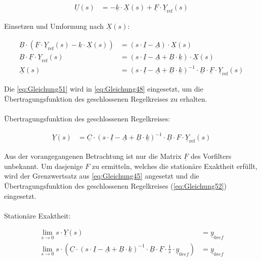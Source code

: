 \begin{align*}
    \underline{U}(s) &= -\underline{k}\cdot\underline{X}(s)+\underline{F}\cdot\underline{Y}_{\mathrm{ref}}(s)
\end{align*}

Einsetzen und Umformung nach $\underline{X}(s)$:

\begin{align}
    \underline{B}\cdot(\underline{F}\cdot\underline{Y}_{\mathrm{ref}}(s)-\underline{k}\cdot\underline{X}(s)) &= (s\cdot\underline{I}-\underline{A})\cdot\underline{X}(s) \nonumber \\
    \underline{B}\cdot \underline{F}\cdot\underline{Y}_{\mathrm{ref}}(s) &= (s\cdot\underline{I}-\underline{A}+\underline{B}\cdot{\underline{k}})\cdot\underline{X}(s) \nonumber \\
    \underline{X}(s) &= (s\cdot\underline{I}-\underline{A}+\underline{B}\cdot{\underline{k}})^{-1}\cdot\underline{B}\cdot \underline{F}\cdot\underline{Y}_{\mathrm{ref}}(s) \label{eq:Gleichung51}
\end{align}

Die \autoref{eq:Gleichung51} wird in \autoref{eq:Gleichung48} eingesetzt, um die Übertragungsfunktion des geschlossenen Regelkreises zu erhalten.\\\\
Übertragungsfunktion des geschlossenen Regelkreises:

\begin{align}
        \underline{Y}(s) &= \underline{C}\cdot(s\cdot\underline{I}-\underline{A}+\underline{B}\cdot{\underline{k}})^{-1}\cdot\underline{B}\cdot F\cdot\underline{Y}_{\mathrm{ref}}(s) \label{eq:Gleichung52}
\end{align}

Aus der vorangegangenen Betrachtung ist nur die Matrix $\underline{F}$ des Vorfilters unbekannt. Um dasjenige $F$ zu ermitteln, welches die stationäre Exaktheit erfüllt, wird der Grenzwertsatz aus \autoref{eq:Gleichung45} angesetzt und die Übertragungsfunktion des geschlossenen Regelkreises (\autoref{eq:Gleichung52}) eingesetzt.\\\\
Stationäre Exaktheit:

\begin{align}
    \lim_{s \to 0} s\cdot \underline{Y}(s) &= \underline{y}_{0ref} \nonumber \\
    \lim_{s \to 0} s\cdot (\underline{C}\cdot(s\cdot\underline{I}-\underline{A}+\underline{B}\cdot{\underline{k}})^{-1}\cdot\underline{B}\cdot\underline{F}\cdot\frac{1}{s}\cdot\underline{y}_{0ref}) &= \underline{y}_{0ref} \label{eq:Gleichung53}
\end{align}

